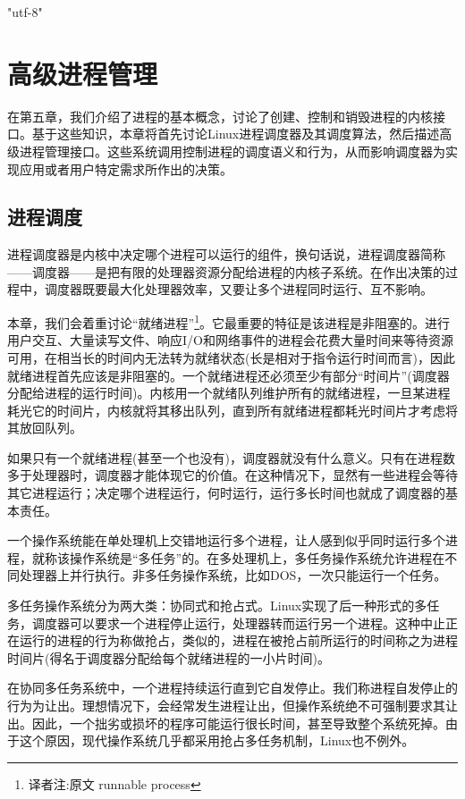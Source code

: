 \ifx\atempxetex\usewhat
\XeTeXinputencoding "utf-8"
\fi
{}

\chapter{高级进程管理}

在第五章，我们介绍了进程的基本概念，讨论了创建、控制和销毁进程的内核接口。基于这些知识，本章将首先讨论Linux进程调度器及其调度算法，然后描述高级进程管理接口。这些系统调用控制进程的调度语义和行为，从而影响调度器为实现应用或者用户特定需求所作出的决策。

\section{进程调度}

进程调度器是内核中决定哪个进程可以运行的组件，换句话说，进程调度器简称------调度器------是把有限的处理器资源分配给进程的内核子系统。在作出决策的过程中，调度器既要最大化处理器效率，又要让多个进程同时运行、互不影响。

本章，我们会着重讨论“就绪进程”\footnote[1]{译者注:原文 runnable process}。它最重要的特征是该进程是非阻塞的。进行用户交互、大量读写文件、响应I/O和网络事件的进程会花费大量时间来等待资源可用，在相当长的时间内无法转为就绪状态(长是相对于指令运行时间而言)，因此就绪进程首先应该是非阻塞的。一个就绪进程还必须至少有部分“时间片”(调度器分配给进程的运行时间)。内核用一个就绪队列维护所有的就绪进程，一旦某进程耗光它的时间片，内核就将其移出队列，直到所有就绪进程都耗光时间片才考虑将其放回队列。

如果只有一个就绪进程(甚至一个也没有)，调度器就没有什么意义。只有在进程数多于处理器时，调度器才能体现它的价值。在这种情况下，显然有一些进程会等待其它进程运行；决定哪个进程运行，何时运行，运行多长时间也就成了调度器的基本责任。

一个操作系统能在单处理机上交错地运行多个进程，让人感到似乎同时运行多个进程，就称该操作系统是“多任务”的。在多处理机上，多任务操作系统允许进程在不同处理器上并行执行。非多任务操作系统，比如DOS，一次只能运行一个任务。

多任务操作系统分为两大类：协同式和抢占式。Linux实现了后一种形式的多任务，调度器可以要求一个进程停止运行，处理器转而运行另一个进程。这种中止正在运行的进程的行为称做抢占，类似的，进程在被抢占前所运行的时间称之为进程时间片(得名于调度器分配给每个就绪进程的一小片时间)。

在协同多任务系统中，一个进程持续运行直到它自发停止。我们称进程自发停止的行为为让出。理想情况下，会经常发生进程让出，但操作系统绝不可强制要求其让出。因此，一个拙劣或损坏的程序可能运行很长时间，甚至导致整个系统死掉。由于这个原因，现代操作系统几乎都采用抢占多任务机制，Linux也不例外。

